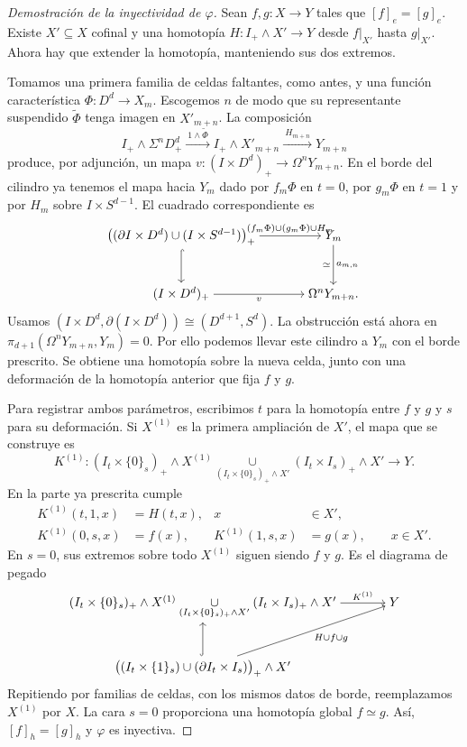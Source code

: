 \begin{proof}[Demostración de la inyectividad de $\varphi$]
Sean $f,g\colon X\to Y$ tales que $[f]_e=[g]_e$. Existe $X'\subseteq X$ cofinal y una homotopía $H\colon I_+\wedge X'\to Y$ desde $f|_{X'}$ hasta $g|_{X'}$. Ahora hay que extender la homotopía, manteniendo sus dos extremos.

Tomamos una primera familia de celdas faltantes, como antes, y una función característica $\Phi\colon D^d\to X_m$. Escogemos $n$ de modo que su representante suspendido $\widetilde\Phi$ tenga imagen en $X'_{m+n}$. La composición
\[
I_+\wedge\Sigma^nD^d_+
\xrightarrow{\ 1\wedge\widetilde\Phi\ }
I_+\wedge X'_{m+n}
\xrightarrow{\ H_{m+n}\ }Y_{m+n}
\]
produce, por adjunción, un mapa $v\colon(I\times D^d)_+\to\Omega^nY_{m+n}$. En el borde del cilindro ya tenemos el mapa hacia $Y_m$ dado por $f_m\Phi$ en $t=0$, por $g_m\Phi$ en $t=1$ y por $H_m$ sobre $I\times S^{d-1}$. El cuadrado correspondiente es
\[
\begin{tikzcd}[cramped,column sep=large,row sep=large]
\bigl((\partial I\times D^d)\cup(I\times S^{d-1})\bigr)_+
\arrow[r,"(f_m\Phi)\cup(g_m\Phi)\cup H_m"] \arrow[d,hook]
& Y_m \arrow[d,"a_{m,n}","\simeq"']\\
(I\times D^d)_+ \arrow[r,"v"'] & \Omega^nY_{m+n}.
\end{tikzcd}
\]
Usamos $(I\times D^d,\partial(I\times D^d))\cong(D^{d+1},S^d)$. La obstrucción está ahora en $\pi_{d+1}(\Omega^nY_{m+n},Y_m)=0$. Por ello podemos llevar este cilindro a $Y_m$ con el borde prescrito. Se obtiene una homotopía sobre la nueva celda, junto con una deformación de la homotopía anterior que fija $f$ y $g$.

Para registrar ambos parámetros, escribimos $t$ para la homotopía entre $f$ y $g$ y $s$ para su deformación. Si $X^{(1)}$ es la primera ampliación de $X'$, el mapa que se construye es
\[
K^{(1)}\colon
(I_t\times\{0\}_s)_+\wedge X^{(1)}
\underset{(I_t\times\{0\}_s)_+\wedge X'}{\cup}
(I_t\times I_s)_+\wedge X'
\longrightarrow Y.
\]
En la parte ya prescrita cumple
\[
\begin{aligned}
K^{(1)}(t,1,x)&=H(t,x),& x&\in X',\\
K^{(1)}(0,s,x)&=f(x),&
K^{(1)}(1,s,x)&=g(x),\qquad x\in X'.
\end{aligned}
\]
En $s=0$, sus extremos sobre todo $X^{(1)}$ siguen siendo $f$ y $g$. Es el diagrama de pegado
\[
\begin{tikzcd}[cramped,column sep=large,row sep=large]
(I_t\times\{0\}_s)_+\wedge X^{(1)}
\underset{(I_t\times\{0\}_s)_+\wedge X'}{\cup}
(I_t\times I_s)_+\wedge X'
\arrow[r,"K^{(1)}"] & Y\\
\bigl((I_t\times\{1\}_s)\cup(\partial I_t\times I_s)\bigr)_+\wedge X'
\arrow[u,hook] \arrow[ur,"H\cup f\cup g"'] &
\end{tikzcd}
\]
Repitiendo por familias de celdas, con los mismos datos de borde, reemplazamos $X^{(1)}$ por $X$. La cara $s=0$ proporciona una homotopía global $f\simeq g$. Así, $[f]_h=[g]_h$ y $\varphi$ es inyectiva.
\end{proof}

